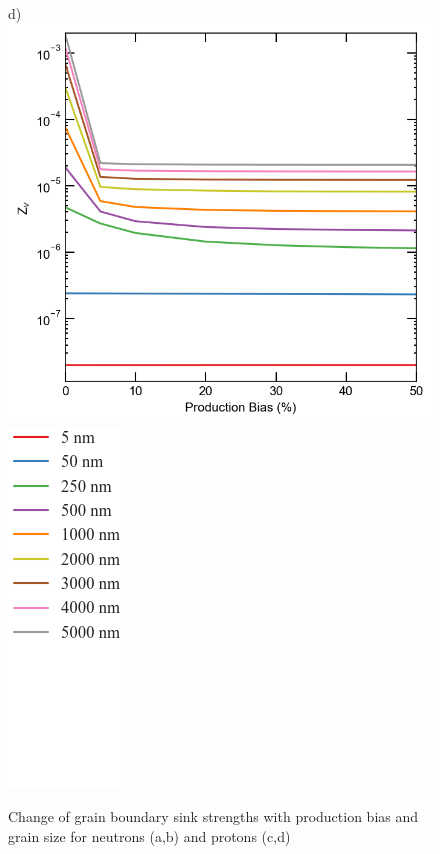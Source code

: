 \documentclass[utf8]{frontiersSCNS} %
\begin{document}
\begin{figure}[h!]
        d)\includegraphics[scale=0.55]{sink_strength_high_neutron_Zv_scaled_nolegend}
        \includegraphics[scale=0.35]{legend}
        \caption{Change of grain boundary sink strengths with production bias and grain size for neutrons (a,b) and protons (c,d)}
        \label{figure:sink_strengths_neutron_bias_Z}
    \end{figure}

\end{document}
